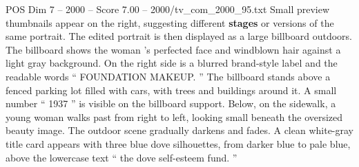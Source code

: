\begin{textsample}{POS Dim 7 – 2000 – Score 7.00 – 2000/tv\_com\_2000\_95.txt}
Small preview thumbnails appear on the right, suggesting different \textbf{stages} or versions of the same portrait.
The edited portrait is then displayed as a large billboard outdoors.
The billboard shows the woman ’s perfected face and windblown hair against a light gray background.
On the right side is a blurred brand-style label and the readable words “ FOUNDATION MAKEUP. ” The billboard stands above a fenced parking lot filled with cars, with trees and buildings around it.
A small number “ 1937 ” is visible on the billboard support.
Below, on the sidewalk, a young woman walks past from right to left, looking small beneath the oversized beauty image.
The outdoor scene gradually darkens and fades.
A clean white-gray title card appears with three blue dove silhouettes, from darker blue to pale blue, above the lowercase text “ the dove self-esteem fund. ”

\end{textsample}
